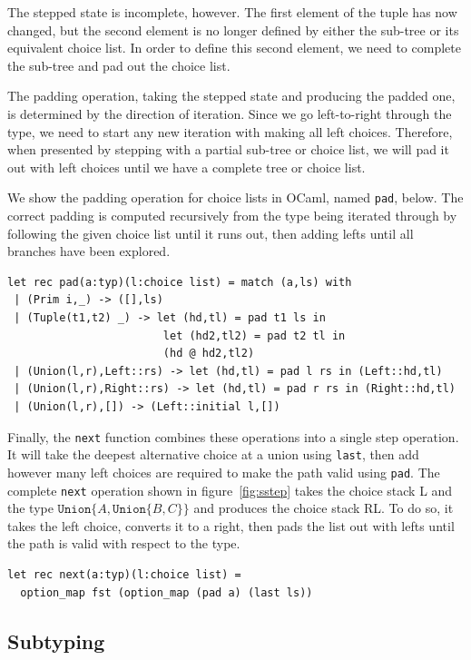 \documentclass[a4paper,english]{lipics-v2019}
\newcommand{\xt}[1]{\texttt{#1}}
\newcommand{\union}[2]{\xt{Union\{}#1,#2\xt{\}}}
\begin{document}
The stepped state is incomplete, however. The first element of the tuple has
now changed, but the second element is no longer defined by either the
sub-tree or its equivalent choice list. In order to define this second
element, we need to complete the sub-tree and pad out the choice list.

The padding operation, taking the stepped state and producing the padded one, is determined
by the direction of iteration. Since we go left-to-right through the type, we need to start
any new iteration with making all left choices. Therefore, when presented by stepping with
a partial sub-tree or choice list, we will pad it out with left choices until we have a complete
tree or choice list.

We show the padding operation for choice lists in OCaml, named
\verb|pad|, below.  The correct padding is computed recursively from
the type being iterated through by following the given choice list until it
runs out, then adding lefts until all branches have been explored.

\begin{lstlisting}
let rec pad(a:typ)(l:choice list) = match (a,ls) with
 | (Prim i,_) -> ([],ls)
 | (Tuple(t1,t2) _) -> let (hd,tl) = pad t1 ls in
                        let (hd2,tl2) = pad t2 tl in
                        (hd @ hd2,tl2)
 | (Union(l,r),Left::rs) -> let (hd,tl) = pad l rs in (Left::hd,tl)
 | (Union(l,r),Right::rs) -> let (hd,tl) = pad r rs in (Right::hd,tl)
 | (Union(l,r),[]) -> (Left::initial l,[])
\end{lstlisting}


Finally, the \verb|next| function combines these operations into
a single step operation. It will take the deepest alternative choice
at a union using \verb|last|, then add however many left
choices are required to make the path valid using \verb|pad|. The
complete \verb|next| operation shown in figure~\ref{fig:sstep} takes
the choice stack L and the type $\union{A}{\union{B}{C}}$ and produces the
choice stack RL. To do so, it takes the left choice, converts it to a right,
then pads the list out with lefts until the path is valid with respect to the 
type.

\begin{lstlisting}
let rec next(a:typ)(l:choice list) =
  option_map fst (option_map (pad a) (last ls))
\end{lstlisting}

\subsection{Subtyping}
\end{document}
